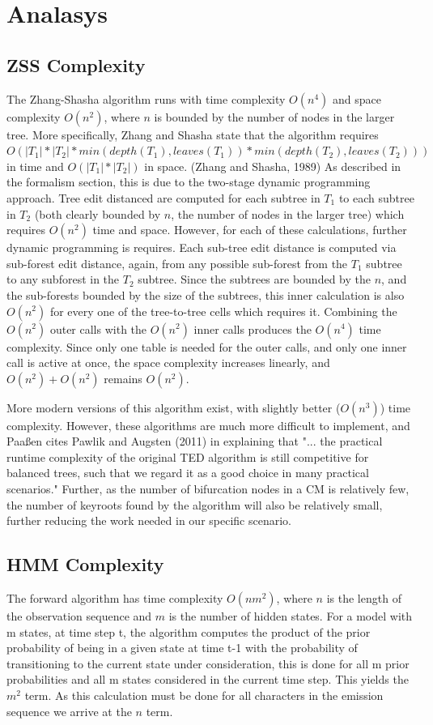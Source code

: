\section{Analasys}
\label{sec:analasys}

\subsection{ZSS Complexity}
The Zhang-Shasha algorithm runs with time complexity $O(n^4)$ and space complexity $O(n^2)$, where $n$ is bounded
by the number of nodes in the larger tree. More specifically, Zhang and Shasha state that the algorithm requires
$O(|T_1| * |T_2| * min(depth(T_1), leaves(T_1)) * min(depth(T_2), leaves(T_2)))$ in time and $O(|T_1|*|T_2|)$ in space.
(Zhang and Shasha, 1989)
As described in the formalism section, this is due to the two-stage dynamic programming approach. Tree edit distanced
are computed for each subtree in $T_1$ to each subtree in $T_2$ (both clearly bounded by $n$, the number of nodes in the larger tree)
which requires $O(n^2)$ time and space. However, for each of these calculations, further dynamic programming is requires.
Each sub-tree edit distance is computed via sub-forest edit distance, again, from any possible sub-forest from the $T_1$
subtree to any subforest in the $T_2$ subtree. Since the subtrees are bounded by the $n$, and the sub-forests bounded
by the size of the subtrees, this inner calculation is also $O(n^2)$ for every one of the tree-to-tree cells which requires it.
Combining the $O(n^2)$ outer calls with the $O(n^2)$ inner calls produces the $O(n^4)$ time complexity. Since only one table is
needed for the outer calls, and only one inner call is active at once, the space complexity increases linearly, and 
$O(n^2) + O(n^2)$ remains $O(n^2)$. 

More modern versions of this algorithm exist, with slightly better ($O(n^3)$) time complexity. However, these algorithms
are much more difficult to implement, and Paaßen \cite{TED} cites Pawlik and Augsten (2011) in explaining that "... the 
practical runtime complexity of the original TED algorithm is still competitive for balanced trees, such that we 
regard it as a good choice in many practical scenarios." Further, as the number of bifurcation nodes in a CM 
is relatively few, the number of keyroots found by the algorithm will also be relatively small, further reducing 
the work needed in our specific scenario.

\subsection{HMM Complexity}
The forward algorithm has time complexity $O(nm^2)$, where $n$ is the length of the
observation sequence and $m$ is the number of hidden states. For a model with m states, 
at time step t, the algorithm computes the product of the prior probability of being in a 
given state at time t-1 with the probability of transitioning to the current state under consideration, this is
done for all m prior probabilities and all m states considered in the current time step. This yields the 
$m^2$ term. As this calculation must be done for all characters in the emission sequence we arrive at the $n$ term.

